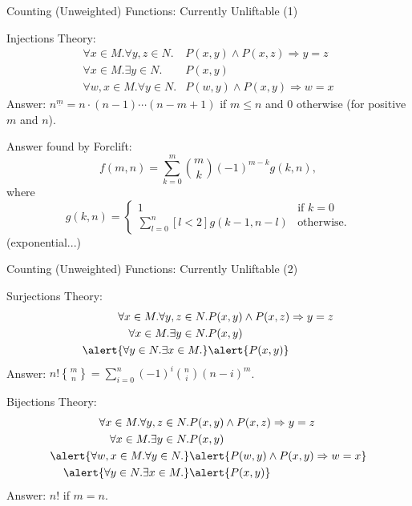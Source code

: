\documentclass{beamer}
\DeclareRobustCommand{\stirling}{\genfrac\{\}{0pt}{}}
\begin{document}
\begin{frame}{Counting (Unweighted) Functions: Currently Unliftable (1)}
  \begin{block}{Injections}
    Theory:
    \begin{align*}
      \forall x \in M. \forall y, z \in N. &P(x, y) \land P(x, z) \Rightarrow y=z \\
      \forall x \in M. \exists y \in N. &P(x, y) \\
      \forall w, x \in M. \forall y \in N. &P(w, y) \land P(x, y) \Rightarrow w=x
    \end{align*}
    Answer: $n^{\underline{m}} = n \cdot (n-1)\cdots(n-m+1)$ if $m \le n$ and $0$ otherwise (for positive $m$ and $n$).

    \pause
    \alert{Answer found by Forclift:}
    \[
    f(m, n) = \sum_{k=0}^m \binom{m}{k}(-1)^{m-k}g(k, n),
    \]
    where
    \[
    g(k, n) =
    \begin{cases}
      1 & \text{if } k = 0 \\
      \sum_{l=0}^n [l < 2]g(k-1, n-l) & \text{otherwise.}
    \end{cases}
    \]
    (exponential...)
  \end{block}
\end{frame}

\begin{frame}{Counting (Unweighted) Functions: Currently Unliftable (2)}
  \begin{block}{Surjections}
    Theory:
    \begin{align*}
      \forall x \in M. \forall y, z \in N. &P(x, y) \land P(x, z) \Rightarrow y=z \\
      \forall x \in M. \exists y \in N. &P(x, y) \\
      \alert{\forall y \in N. \exists x \in M.} &\alert{P(x, y)}
    \end{align*}
    Answer: $n!\stirling{m}{n} = \sum_{i=0}^n (-1)^i\binom{n}{i}(n-i)^m$.
  \end{block}
  \begin{block}{Bijections}
    Theory:
    \begin{align*}
      \forall x \in M. \forall y, z \in N. &P(x, y) \land P(x, z) \Rightarrow y=z \\
      \forall x \in M. \exists y \in N. &P(x, y) \\
      \alert{\forall w, x \in M. \forall y \in N.} &\alert{P(w, y) \land P(x, y) \Rightarrow w=x} \\
      \alert{\forall y \in N. \exists x \in M.} &\alert{P(x, y)}
    \end{align*}
    Answer: $n!$ if $m=n$.
  \end{block}
\end{frame}
\end{document}
